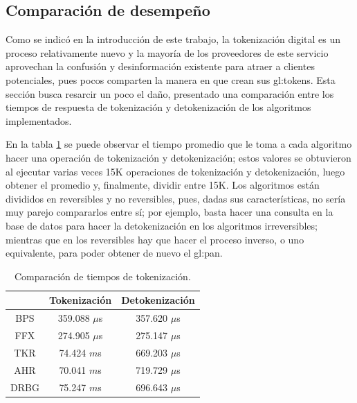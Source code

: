 %
%
%

\subsection{Comparación de desempeño}
\label{sec:comparacion}

Como se indicó en la introducción de este trabajo, la tokenización digital es un
proceso relativamente nuevo y la mayoría de los proveedores de este servicio
aprovechan la confusión y desinformación existente para atraer a clientes
potenciales, pues pocos comparten la manera en que crean sus \glspl{gl:token}.
Esta sección busca resarcir un poco el daño, presentado una comparación entre
los tiempos de respuesta de tokenización y detokenización de los algoritmos
implementados.

En la tabla \ref{tabla:tiempos_tokenizacion} se puede observar el tiempo
promedio que le toma a cada algoritmo hacer una operación de tokenización
y detokenización; estos valores se obtuvieron al ejecutar varias veces 15K
operaciones de tokenización y detokenización, luego obtener el promedio
y, finalmente, dividir entre 15K. Los algoritmos están divididos en reversibles
y no reversibles, pues, dadas sus características, no sería muy parejo
compararlos entre sí; por ejemplo, basta hacer una consulta en la base de datos
para hacer la detokenización en los algoritmos irreversibles; mientras que en
los reversibles hay que hacer el proceso inverso, o uno equivalente, para
poder obtener de nuevo el \gls{gl:pan}.

\begin{table}
  \begin{center}
    \begin{tabular}{c|c|c|}
      \cline{2-3}
      & Tokenización & Detokenización \\
      \hline
      \multicolumn{1}{|c|}{BPS}
        & 359.088   $\mu$s & 357.620 $\mu$s   \\\hline
      \multicolumn{1}{|c|}{FFX}
        & 274.905   $\mu$s & 275.147 $\mu$s   \\\hline

      \multicolumn{1}{|c|}{TKR}
        & 74.424  $m$s & 669.203 $\mu$s   \\\hline
      \multicolumn{1}{|c|}{AHR}
        & 70.041  $m$s & 719.729 $\mu$s   \\\hline
      \multicolumn{1}{|c|}{DRBG}
        & 75.247  $m$s & 696.643 $\mu$s  \\\hline
    \end{tabular}

    \caption{Comparación de tiempos de tokenización.}
    \label{tabla:tiempos_tokenizacion}
  \end{center}
\end{table}

